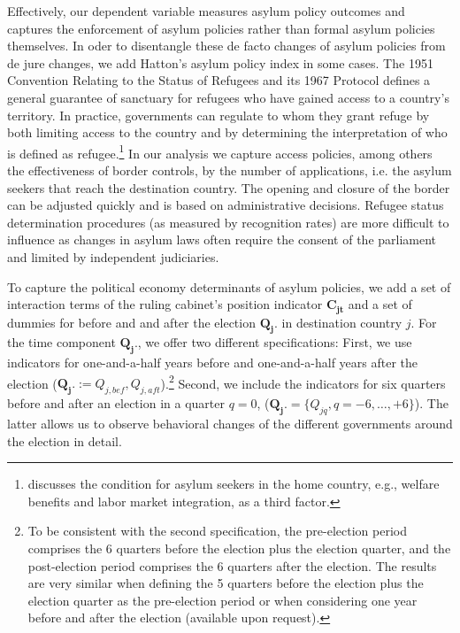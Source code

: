 \documentclass[a4paper,12pt]{article}
\begin{document}
Effectively, our dependent variable measures asylum policy outcomes and captures the enforcement of asylum policies rather than formal asylum policies themselves. In oder to disentangle these de facto changes of asylum policies from de jure changes, we add Hatton's asylum policy index in some cases. The 1951 Convention Relating to the Status of Refugees and its 1967 Protocol defines a general guarantee of sanctuary for refugees who have gained access to a country's territory. In practice, governments can regulate to whom they grant refuge by both limiting access to the country and by determining the interpretation of who is defined as refugee.\footnote{\citet{hatton2009} discusses the condition for asylum seekers in the home country, e.g., welfare benefits and labor market integration, as a third factor.} In our analysis we capture access policies, among others the effectiveness of border controls, by the number of applications, i.e. the asylum seekers that reach the destination country. The opening and closure of the border can be adjusted quickly and is based on administrative decisions. Refugee status determination procedures (as measured by recognition rates) are more difficult to influence as changes in asylum laws often require the consent of the parliament and limited by independent judiciaries.  

To capture the political economy determinants of asylum policies, we add a set of interaction terms of the ruling cabinet's position indicator $\mathbf{C_{jt}}$ and  a set of dummies for before and and after the election $\mathbf{Q_j.}$ in destination country $j$. For the time component $\mathbf{Q_j.}$, we offer two different specifications: First, we use indicators for one-and-a-half years before and one-and-a-half years after the election ($\mathbf{Q_j.} := Q_{j,bef},  Q_{j,aft}$).\footnote{To be consistent with the second specification, the pre-election period comprises the 6 quarters before the election plus the election quarter, and the post-election period comprises the 6 quarters after the election. The results are very similar when defining the 5 quarters before the election plus the election quarter as the pre-election period or when considering one year before and after the election (available upon request).} Second, we include the indicators for six quarters before and after an election in a quarter $q=0$, ($\mathbf{Q_j.} =\{Q_{jq}, q = -6, \ldots, +6\}$). The latter allows us to observe behavioral changes of the different governments around the election in detail.
\end{document}
